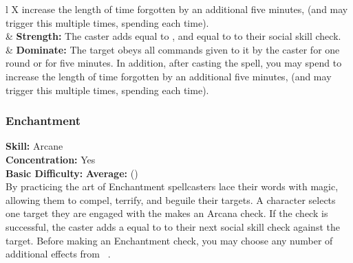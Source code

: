\begin{table*}[!htb]
\begin{GenesysTable}{l X}
                            increase the length of time forgotten by an additional
                            five minutes, (and may trigger this multiple times,
                            spending \advantage each time).\\
\difficulty\difficulty  & \textbf{Strength:} The caster adds \success equal to \success,
                            and \advantage equal to \advantage to their social
                            skill check.\\
\difficulty\difficulty  & \textbf{Dominate:} The target obeys all commands given to it by
                            the caster for one round or for five minutes. In
                            addition, after casting the spell, you may spend \advantage
                            to increase the length of time forgotten by an
                            additional five minutes, (and may trigger this
                            multiple times, spending \advantage each time).\\
\end{GenesysTable}
\label{table:magic_enchantment}
\end{table*}

\subsubsection{Enchantment}
\textbf{Skill:} Arcane\\
\textbf{Concentration:} Yes\\
\textbf{Basic Difficulty:} \textbf{Average:} (\difficulty\difficulty)\\
By practicing the art of Enchantment spellcasters lace their words with magic,
allowing them to compel, terrify, and beguile their targets. A character selects
one target they are engaged with the makes an Arcana check. If the check is
successful, the caster adds a equal to \advantage to their next social skill
check against the target. Before making an Enchantment check, you may choose
any number of additional effects from ~.
